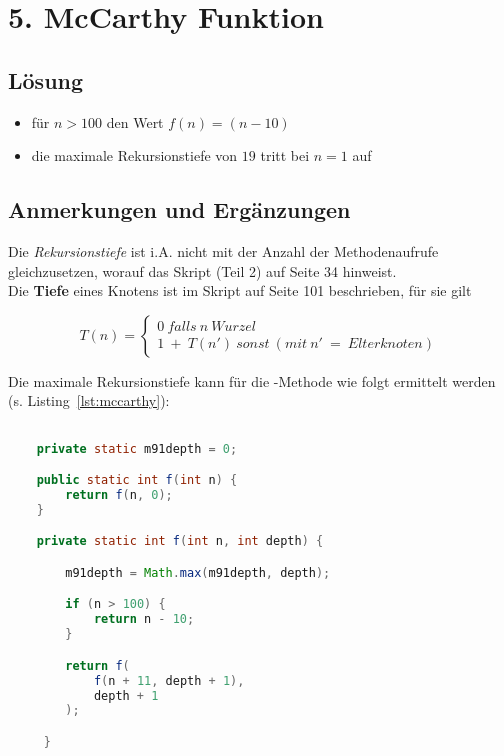 \usepackage{amsmath}\chapter{5. McCarthy Funktion}

\section*{Lösung}

\begin{itemize}
    \itemn für $1 \leq i \leq 100$ liefert die Funktion den Wert $f(i) = 91$
    \item für $n > 100$ den Wert $f(n) = (n - 10)$
    \item die maximale Rekursionstiefe von $19$ tritt bei $n = 1$ auf
\end{itemize}


\section*{Anmerkungen und Ergänzungen}

Die \textit{Rekursionstiefe} ist i.A. nicht mit der Anzahl der Methodenaufrufe gleichzusetzen, worauf das Skript (Teil 2) auf Seite 34 hinweist.
\\

Die \textbf{Tiefe} eines Knotens ist im Skript auf Seite 101 beschrieben, für sie gilt

\begin{equation}

    T(n) = \begin{cases}
        0\ falls\ n\ Wurzel \\
        1\ +\ T(n')\ sonst\ (mit\ n'\ =\ Elterknoten)
        \end{cases}

\end{equation}

Die maximale Rekursionstiefe kann für die -Methode wie folgt ermittelt werden (s. Listing~\ref{lst:mccarthy}):

\begin{lstlisting}[language=java,label=lst:mccarthy]

    private static m91depth = 0;

    public static int f(int n) {
        return f(n, 0);
    }

    private static int f(int n, int depth) {

        m91depth = Math.max(m91depth, depth);

        if (n > 100) {
            return n - 10;
        }

        return f(
            f(n + 11, depth + 1),
            depth + 1
        );

     }

\end{lstlisting}
